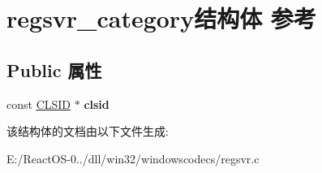 \hypertarget{structregsvr__category}{}\section{regsvr\+\_\+category结构体 参考}
\label{structregsvr__category}
\subsection*{Public 属性}
\begin{DoxyCompactItemize}
\item 
\mbox{\label{structregsvr__category_a75ae2969939f74d89e760911830d80f0}} 
const \hyperlink{struct___i_i_d}{C\+L\+S\+ID} $\ast$ {\bfseries clsid}
\end{DoxyCompactItemize}


该结构体的文档由以下文件生成\+:\begin{DoxyCompactItemize}
\item 
E\+:/\+React\+O\+S-\/0../dll/win32/windowscodecs/regsvr.\+c\end{DoxyCompactItemize}
